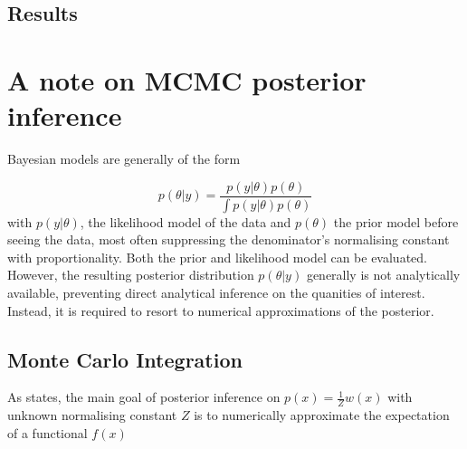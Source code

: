 \documentclass[11pt]{article}
\begin{document}
%
        \subsection{Results}


    \section{A note on MCMC posterior inference} \label{inference}
        Bayesian models are generally of the form

        \begin{equation}
            p(\theta|y) = \frac{p(y|\theta)p(\theta)}{\int p(y|\theta)p(\theta)}
        \end{equation}
        with $p(y|\theta)$, the likelihood model of the data and $p(\theta)$ the prior model before seeing the data, most often suppressing the denominator's normalising constant with proportionality. Both the prior and likelihood model can be evaluated. However, the resulting posterior distribution $p(\theta|y)$ generally is not analytically available, preventing direct analytical inference on the quanities of interest. Instead, it is required to resort to numerical approximations of the posterior.

        \subsection{Monte Carlo Integration}
        As \cite{mackay2003information} states, the main goal of posterior inference on $p(x)= \frac{1}{Z} w(x)$ with unknown normalising constant $Z$ is to numerically approximate the expectation of a functional $f(x)$
\end{document}
